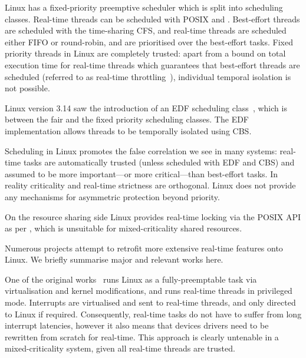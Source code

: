 Linux has a fixed-priority preemptive scheduler which is split into scheduling classes.  Real-time
threads can be scheduled with \gls{POSIX} \schedfifo and \schedsporadic. Best-effort threads are
scheduled with the time-sharing \gls{CFS}, and real-time threads are scheduled either \gls{FIFO} or round-robin, and
are prioritised over the best-effort tasks.  Fixed priority threads in Linux are completely trusted:
apart from a bound on total execution time for real-time threads which guarantees that best-effort
threads are scheduled (referred to as real-time throttling~\citep{Corbet_08}), individual temporal
isolation is not possible.

Linux version 3.14 saw the introduction of an \gls{EDF} scheduling class~\citep{Corbet_09},
which is between the fair and the fixed priority scheduling classes.  The \gls{EDF} implementation
allows threads to be temporally isolated using \gls{CBS}.

Scheduling in Linux promotes the false correlation we see in many systems: real-time tasks are
automatically trusted (unless scheduled with \gls{EDF} and \gls{CBS}) and assumed to be more important---or more
critical---than best-effort tasks.  In reality criticality and real-time strictness are orthogonal.
Linux does not provide any mechanisms for asymmetric protection beyond priority.

On the resource sharing side Linux provides real-time locking via the \gls{POSIX} API as per
, which is unsuitable for mixed-criticality shared resources.

Numerous projects attempt to retrofit more extensive real-time features onto
Linux.  We briefly summarise major and relevant works here. 

One of the original
works~\citep{Yodaiken_Barabanov_97} runs Linux as a fully-preemptable task via virtualisation and
kernel modifications, and runs real-time threads in privileged mode. Interrupts are virtualised and
sent to real-time threads, and only directed to
Linux if required. Consequently, real-time tasks do not have to suffer from long interrupt
latencies, however it also means that devices drivers need to be rewritten from scratch for
real-time. This approach is clearly untenable in a mixed-criticality system, given all real-time
threads are trusted. 

